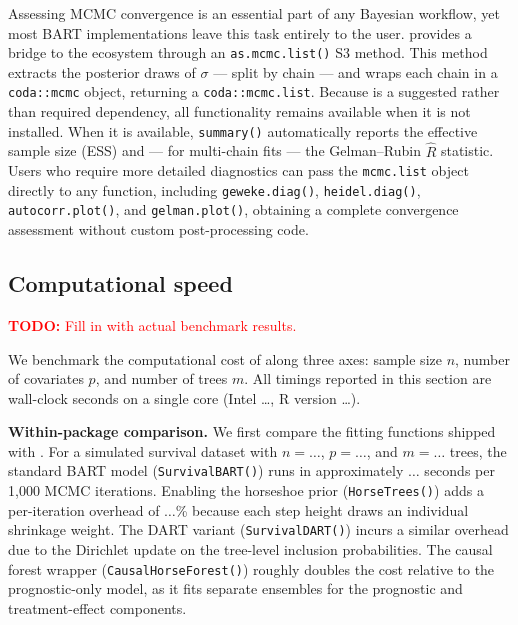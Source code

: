 Assessing MCMC convergence is an essential part of any Bayesian workflow, yet most BART implementations leave this task entirely to the user.  provides a bridge to the  ecosystem \citep{plummer2006coda} through an \texttt{as.mcmc.list()} S3 method. This method extracts the posterior draws of \(\sigma\) --- split by chain --- and wraps each chain in a \texttt{coda::mcmc} object, returning a \texttt{coda::mcmc.list}. Because  is a suggested rather than required dependency, all functionality remains available when it is not installed. When it is available, \texttt{summary()} automatically reports the effective sample size (ESS) and --- for multi-chain fits --- the Gelman--Rubin \(\hat{R}\) statistic. Users who require more detailed diagnostics can pass the \texttt{mcmc.list} object directly to any  function, including \texttt{geweke.diag()}, \texttt{heidel.diag()}, \texttt{autocorr.plot()}, and \texttt{gelman.plot()}, obtaining a complete convergence assessment without custom post-processing code.

\subsection{Computational speed}\label{computational-speed}

\textcolor{red}{\textbf{TODO:} Fill in with actual benchmark results.}

We benchmark the computational cost of  along three axes: sample size \(n\), number of covariates \(p\), and number of trees \(m\). All timings reported in this section are wall-clock seconds on a single core (Intel \ldots, R version \ldots).

\textbf{Within-package comparison.} We first compare the fitting functions shipped with . For a simulated survival dataset with \(n = \ldots\), \(p = \ldots\), and \(m = \ldots\) trees, the standard BART model (\texttt{SurvivalBART()}) runs in approximately \(\ldots\) seconds per 1,000 MCMC iterations. Enabling the horseshoe prior (\texttt{HorseTrees()}) adds a per-iteration overhead of \(\ldots\)\% because each step height draws an individual shrinkage weight. The DART variant (\texttt{SurvivalDART()}) incurs a similar overhead due to the Dirichlet update on the tree-level inclusion probabilities. The causal forest wrapper (\texttt{CausalHorseForest()}) roughly doubles the cost relative to the prognostic-only model, as it fits separate ensembles for the prognostic and treatment-effect components.

